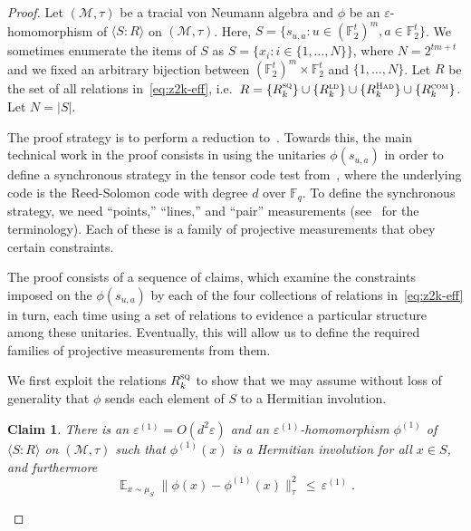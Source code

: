 \documentclass[11pt]{article}
\newtheorem{claim}[theorem]{Claim}
\theoremstyle{definition}
\DeclareMathOperator*{\Expectation}{\mathbb{E}}
\newcommand{\Es}[1]{\Expectation_{#1}}
\newcommand{\F}{\ensuremath{\mathbb{F}}}
\newcommand{\ld}{\textsc{ld}}
\newcommand{\com}{\textsc{com}}
\newcommand{\sq}{\textsc{sq}}
\newcommand{\mM}{\ensuremath{\mathcal{M}}}
\newcommand{\had}{\textsc{Had}}
\newcommand{\eps}{\varepsilon}
\begin{document}
\begin{proof}
Let $(\mM,\tau)$ be a tracial von Neumann algebra and $\phi$ be an $\eps$-homomorphism of $\langle S:R\rangle$ on $(\mM,\tau)$. 
 Here, $S = \{s_{u,a}: u\in (\F_2^t)^m, a\in \F_2^t\}$. We sometimes enumerate the items of $S$ as $S=\{x_i: i\in\{1,\ldots,N\}\}$, where $N=2^{tm+t}$ and we fixed an arbitrary bijection between $(\F_2^t)^m\times \F_2^t$ and $\{1,\ldots,N\}$. Let $R$ be the set of all relations in~\eqref{eq:z2k-eff}, i.e.\ $R= \{R_k^\sq\}\cup \{R^\ld_k\}\cup\{R^\had_k\}\cup\{R^\com_k\}$. Let $N=|S|$.

The proof strategy is to perform a reduction to~\cite[Theorem 4.1]{ji2022quantum}. Towards this, the main technical work in the proof consists in using the unitaries $\phi(s_{u,a})$ in order to define a synchronous strategy in the tensor code test from~\cite{ji2022quantum}, where the underlying code is the Reed-Solomon code with degree $d$ over $\F_q$. To define the synchronous strategy, we need ``points,'' ``lines,'' and ``pair'' measurements (see~\cite{ji2022quantum} for the terminology). Each of these is a family of projective measurements that obey certain constraints. 

The proof consists of a sequence of claims, which examine the constraints imposed on the $\phi(s_{u,a})$ by each of the four collections of relations in~\eqref{eq:z2k-eff} in turn, each time using a set of relations to evidence a particular structure among these unitaries. Eventually, this will allow us to define the required families of projective measurements from them. 

We first exploit the relations $R_k^\sq$ to show that we may assume without loss of generality that $\phi$ sends each element of $S$ to a Hermitian involution. 

\begin{claim}\label{claim:z2-stab-1}
There is an $\eps^{(1)}=O(d^2\eps)$ and an $\eps^{(1)}$-homomorphism $\phi^{(1)}$ of $\langle S:R\rangle$ on $(\mM,\tau)$ such that $\phi^{(1)}(x)$ is a Hermitian involution for all $x\in S$, and furthermore
\begin{equation}\label{eq:z2-stab-1a}
 \Es{x\sim\mu_S} \big\| \phi(x) - \phi^{(1)}(x) \big\|_\tau^2 \,\leq\, \eps^{(1)}\;.
\end{equation}
\end{claim}


\end{proof}
\end{document}

